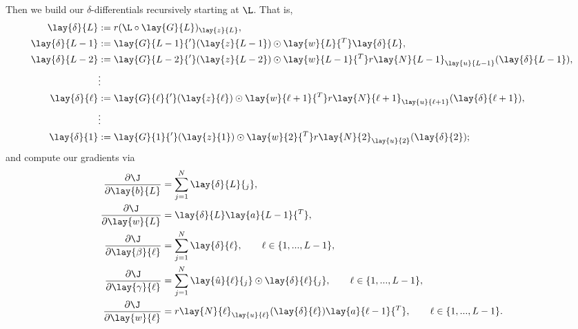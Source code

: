 Then we build our $\delta$-differentials recursively starting at $\L$.  That is,
\begin{align*}
	\lay{\delta}{L}&:=r(\L\circ\lay{G}{L})_{\lay{z}{L}},\\
	\lay{\delta}{L-1}&:=\lay{G}{L-1}{'}(\lay{z}{L-1})\odot\lay{w}{L}{^T}\lay{\delta}{L},\\
	\lay{\delta}{L-2}&:=\lay{G}{L-2}{'}(\lay{z}{L-2})\odot\lay{w}{L-1}{^T}r\lay{N}{L-1}_{\lay{u}{L-1}}(\lay{\delta}{L-1}),\\
	&\vdots\\
	\lay{\delta}{\ell}&:=\lay{G}{\ell}{'}(\lay{z}{\ell})\odot\lay{w}{\ell+1}{^T}r\lay{N}{\ell+1}_{\lay{u}{\ell+1}}(\lay{\delta}{\ell+1}),\\
	&\vdots\\
	\lay{\delta}{1}&:=\lay{G}{1}{'}(\lay{z}{1})\odot\lay{w}{2}{^T}r\lay{N}{2}_{\lay{u}{2}}(\lay{\delta}{2});
\end{align*}
and compute our gradients via
\begin{align*}
	\frac{\partial\J}{\partial\lay{b}{L}}&=\sum_{j=1}^N\lay{\delta}{L}{_j},\\
	\frac{\partial\J}{\partial\lay{w}{L}}&=\lay{\delta}{L}\lay{a}{L-1}{^T},\\
	\frac{\partial\J}{\partial\lay{\beta}{\ell}}&=\sum_{j=1}^N\lay{\delta}{\ell},\qquad\ell\in\{1,...,L-1\},\\
	\frac{\partial\J}{\partial\lay{\gamma}{\ell}}&=\sum_{j=1}^N\lay{\hat{u}}{\ell}{_j}\odot\lay{\delta}{\ell}{_j},\qquad\ell\in\{1,...,L-1\},\\
	\frac{\partial\J}{\partial\lay{w}{\ell}}&=r\lay{N}{\ell}_{\lay{u}{\ell}}(\lay{\delta}{\ell})\lay{a}{\ell-1}{^T},\qquad\ell\in\{1,...,L-1\}.
\end{align*}







